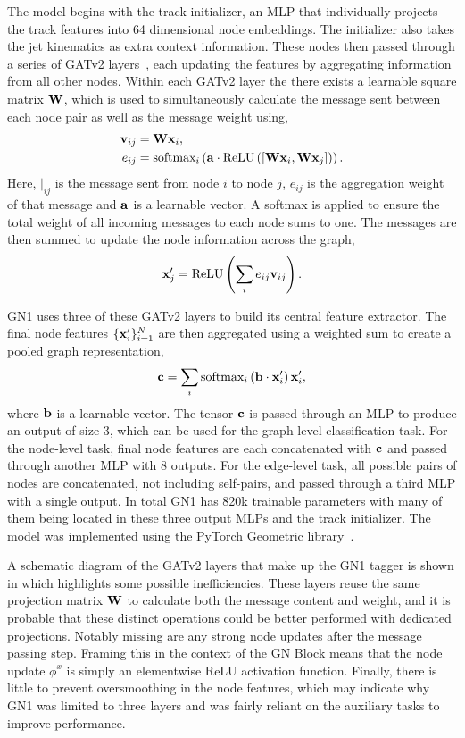The model begins with the track initializer, an MLP that individually projects the track features into 64 dimensional node embeddings.
The initializer also takes the jet kinematics as extra context information.
These nodes then passed through a series of GATv2 layers~\cite{GATv2}, each updating the features by aggregating information from all other nodes.
Within each GATv2 layer the there exists a learnable square matrix $\mathbf{W}$, which is used to simultaneously calculate the message sent between each node pair as well as the message weight using,
\begin{align}
    \mathbf{v}_{ij} & = \mathbf{W} \mathbf{x}_i,                                                                     \\
    e_{ij}     & = \text{softmax}_i\left(\mathbf{a} \cdot \text{ReLU}\left([\mathbf{W} \mathbf{x}_i, \mathbf{W} \mathbf{x}_j]\right)\right).
\end{align}
Here, $\vert_{ij}$ is the message sent from node $i$ to node $j$,
$e_{ij}$ is the aggregation weight of that message and $\mathbf{a}$ is a learnable vector.
A softmax is applied to ensure the total weight of all incoming messages to each node sums to one.
The messages are then summed to update the node information across the graph,
\begin{equation}
    \mathbf{x}_j' = \text{ReLU}\left(\sum_{i} e_{ij} \mathbf{v}_{ij}\right).
\end{equation}

GN1 uses three of these GATv2 layers to build its central feature extractor.
The final node features $\{\mathbf{x}_i'\}_{i=1}^{N}$ are then aggregated using a weighted sum to create a pooled graph representation,
\begin{equation}
    \mathbf{c} = \sum_{i} \text{softmax}_i\left(\mathbf{b} \cdot \mathbf{x}_i'\right) \mathbf{x}_i',
\end{equation}
where $\mathbf{b}$ is a learnable vector.
The tensor $\mathbf{c}$ is passed through an MLP to produce an output of size 3, which can be used for the graph-level classification task.
For the node-level task, final node features are each concatenated with $\mathbf{c}$ and passed through another MLP with 8 outputs.
For the edge-level task, all possible pairs of nodes are concatenated, not including self-pairs, and passed through a third MLP with a single output.
In total GN1 has 820k trainable parameters with many of them being located in these three output MLPs and the track initializer.
The model was implemented using the PyTorch Geometric library~\cite{PYG}.

A schematic diagram of the GATv2 layers that make up the GN1 tagger is shown in  which highlights some possible inefficiencies.
These layers reuse the same projection matrix $\mathbf{W}$ to calculate both the message content and weight, and it is probable that these distinct operations could be better performed with dedicated projections.
Notably missing are any strong node updates after the message passing step.
Framing this in the context of the GN Block means that the node update $\phi^x$ is simply an elementwise ReLU activation function.
Finally, there is little to prevent oversmoothing in the node features, which may indicate why GN1 was limited to three layers and was fairly reliant on the auxiliary tasks to improve performance.

